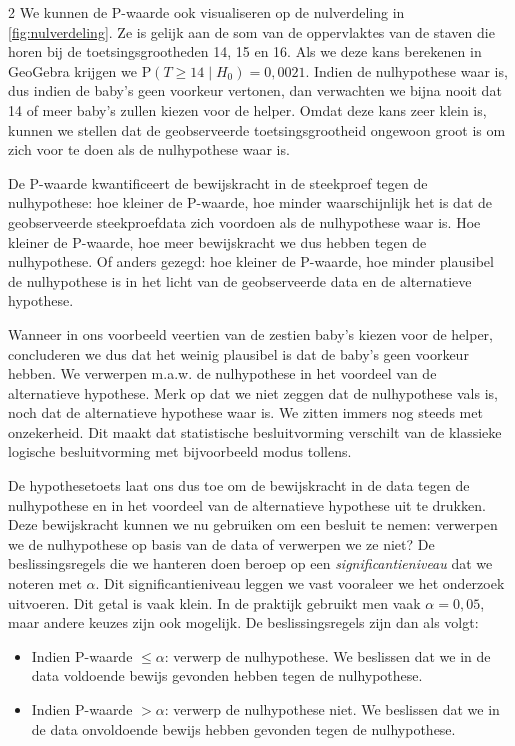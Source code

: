 \begin{multicols}{2}
We kunnen de P-waarde ook visualiseren op de nulverdeling in \autoref{fig:nulverdeling}. Ze is gelijk aan de som van de oppervlaktes van de staven die horen bij de toetsingsgrootheden 14, 15 en 16. Als we deze kans berekenen in GeoGebra krijgen we $\textrm{P}(T \geq 14 \mid H_0) = 0,0021$. Indien de nulhypothese waar is, dus indien de baby's geen voorkeur vertonen, dan verwachten we bijna nooit dat 14 of meer baby's zullen kiezen voor de helper. Omdat deze kans zeer klein is, kunnen we stellen dat de geobserveerde toetsingsgrootheid ongewoon groot is om zich voor te doen als de nulhypothese waar is. 

De P-waarde kwantificeert de bewijskracht in de steekproef tegen de nulhypothese: hoe kleiner de P-waarde, hoe minder waarschijnlijk het is dat de geobserveerde steekproefdata zich voordoen als de nulhypothese waar is. Hoe kleiner de P-waarde, hoe meer bewijskracht we dus hebben tegen de nulhypothese. Of anders gezegd: hoe kleiner de P-waarde, hoe minder plausibel de nulhypothese is in het licht van de geobserveerde data en de alternatieve hypothese. 

Wanneer in ons voorbeeld veertien van de zestien baby's kiezen voor de helper, concluderen we dus dat het weinig plausibel is dat de baby's geen voorkeur hebben. We verwerpen m.a.w. de nulhypothese in het voordeel van de alternatieve hypothese. Merk op dat we niet zeggen dat de nulhypothese vals is, noch dat de alternatieve hypothese waar is. We zitten immers nog steeds met onzekerheid. Dit maakt dat statistische besluitvorming verschilt van de klassieke logische besluitvorming met bijvoorbeeld modus tollens. 

De hypothesetoets laat ons  dus toe om de bewijskracht in de data tegen de nulhypothese en in het voordeel van de alternatieve hypothese uit te drukken. Deze bewijskracht kunnen we nu gebruiken om een besluit te nemen: verwerpen we de nulhypothese op basis van de data of verwerpen we ze niet? De beslissingsregels die we hanteren doen beroep op een \emph{significantieniveau} dat we noteren met $\alpha$. Dit significantieniveau leggen we vast vooraleer we het onderzoek uitvoeren. Dit getal is vaak klein. In de praktijk gebruikt men vaak $\alpha=0,05$, maar andere keuzes zijn ook mogelijk. De beslissingsregels zijn dan als volgt:

\begin{itemize}
\item Indien P-waarde  $\leq \alpha$: verwerp de nulhypothese. We beslissen dat we in de data voldoende bewijs gevonden hebben tegen de nulhypothese.
\item Indien P-waarde  $> \alpha$: verwerp de nulhypothese niet. We beslissen dat we in de data onvoldoende bewijs hebben gevonden tegen de nulhypothese.
\end{itemize}


\end{multicols}
